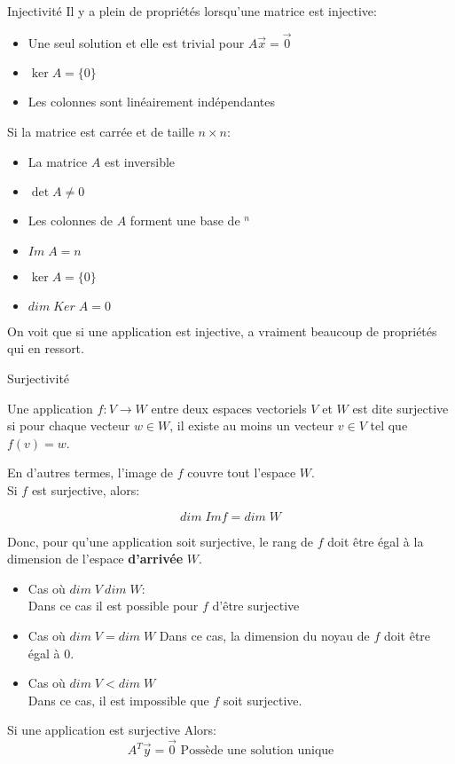 \begin{parag}{Injectivité}
    Il y a plein de propriétés lorsqu'une matrice est injective:
    \begin{truc}
        \begin{itemize}
            \item Une seul solution et elle est trivial pour $A\vec{x} = \vec{0}$
            \item $\ker A = \{0\}$
            \item Les colonnes sont linéairement indépendantes
        \end{itemize}
        Si la matrice est carrée et de taille $n \times n$:
        \begin{itemize}
            \item La matrice $A$ est inversible
            \item $\det A \neq 0$
            \item Les colonnes de $A$ forment une base de \R$^n$
            \item $Im\; A = n$
            \item $\ker A = \{0\}$
            \item $dim\; Ker\; A = 0$
        \end{itemize}
    \end{truc}
    On voit que si une application est injective, a vraiment beaucoup de propriétés qui en ressort.
\end{parag}

\begin{parag}{Surjectivité}
    \begin{truc}
        Une application $f : V \to W$ entre deux espaces vectoriels $V$ et $W$ est dite surjective si pour chaque vecteur $w \in W$, il existe au moins un vecteur $v \in V$ tel que $f(v) = w$.
    \end{truc}
     En d'autres termes, l'image de $f$ couvre tout l'espace $W$.
    \\
    Si $f$  est surjective, alors:
    \begin{truc}
        \[dim\; Imf = dim\; W\]
    \end{truc}  
    Donc, pour qu'une application soit surjective, le rang de $f$ doit être égal à la dimension de l'espace \textbf{d'arrivée} $W$.
    \begin{itemize}
        \item Cas où $dim\;V \> dim\;W$:
        \\
        Dans ce cas il est possible pour $f$ d'être surjective
        \item Cas où $dim\;V = dim\;W$
        Dans ce cas, la dimension du noyau de $f$ doit être égal à $0$. 
        \item Cas où $dim \; V < dim\; W$
        \\
        Dans ce cas, il est impossible que $f$ soit surjective.
    \end{itemize}
    \begin{truc}
        Si une application est surjective Alors:
        \[A^T\vec{y} = \vec{0} \text{ Possède une solution unique}\]
        
    \end{truc}
\end{parag}

